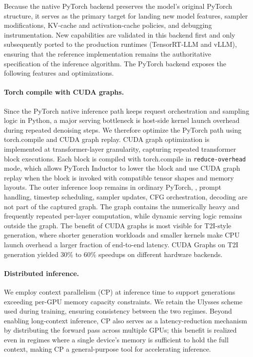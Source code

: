 Because the native PyTorch backend preserves the model's original PyTorch structure, it serves as the primary target for landing new model features, sampler modifications, KV-cache and activation-cache policies, and debugging instrumentation. New capabilities are validated in this backend first and only subsequently ported to the production runtimes (TensorRT-LLM and vLLM), ensuring that the reference implementation remains the authoritative specification of the inference algorithm. The PyTorch backend exposes the following features and optimizations.

\paragraph{Torch compile with CUDA graphs.}

Since the PyTorch native inference path keeps request orchestration and sampling logic in Python, a major serving bottleneck is host-side kernel launch overhead during repeated denoising steps. We therefore optimize the PyTorch path using torch.compile and CUDA graph replay. CUDA graph optimization is implemented at transformer-layer granularity, capturing repeated transformer block executions. Each block is compiled with torch.compile in \texttt{reduce-overhead} mode, which allows PyTorch Inductor to lower the block and use CUDA graph replay when the block is invoked with compatible tensor shapes and memory layouts. The outer inference loop remains in ordinary PyTorch, \ie, prompt handling, timestep scheduling, sampler updates, CFG orchestration, decoding are not part of the captured graph. The graph contains the numerically heavy and frequently repeated per-layer computation, while dynamic serving logic remains outside the graph. The benefit of CUDA graphs is most visible for T2I-style generation, where shorter generation workloads and smaller kernels make CPU launch overhead a larger fraction of end-to-end latency. CUDA Graphs on T2I generation yielded 30\% to 60\% speedups on different hardware backends.

\paragraph{Distributed inference.}

We employ context parallelism (CP) at inference time to support generations exceeding per-GPU memory capacity constraints. We retain the Ulysses scheme~\citep{deepspeed_ulysses} used during training, ensuring consistency between the two regimes. Beyond enabling long-context inference, CP also serves as a latency-reduction mechanism by distributing the forward pass across multiple GPUs; this benefit is realized even in regimes where a single device's memory is sufficient to hold the full context, making CP a general-purpose tool for accelerating inference.


